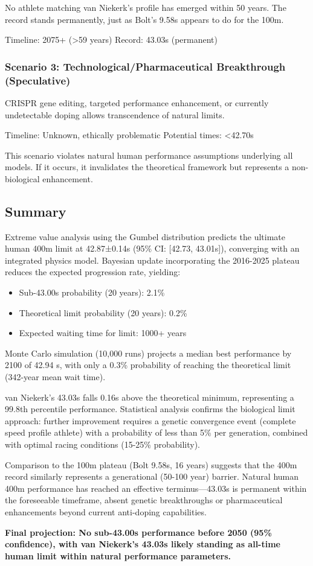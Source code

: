 No athlete matching van Niekerk's profile has emerged within 50 years. The record stands permanently, just as Bolt's 9.58s appears to do for the 100m.

Timeline: 2075+ (>59 years)
Record: 43.03s (permanent)

\subsubsection{Scenario 3: Technological/Pharmaceutical Breakthrough (Speculative)}

CRISPR gene editing, targeted performance enhancement, or currently undetectable doping allows transcendence of natural limits.

Timeline: Unknown, ethically problematic
Potential times: <42.70s

This scenario violates natural human performance assumptions underlying all models. If it occurs, it invalidates the theoretical framework but represents a non-biological enhancement.

\subsection{Summary}

Extreme value analysis using the Gumbel distribution predicts the ultimate human 400m limit at 42.87±0.14s (95\% CI: [42.73, 43.01s]), converging with an integrated physics model. Bayesian update incorporating the 2016-2025 plateau reduces the expected progression rate, yielding:

\begin{itemize}
    \item Sub-43.00s probability (20 years): 2.1\%
    \item Theoretical limit probability (20 years): 0.2\%
    \item Expected waiting time for limit: 1000+ years
\end{itemize}

Monte Carlo simulation (10,000 runs) projects a median best performance by 2100 of 42.94 s, with only a 0.3\% probability of reaching the theoretical limit (342-year mean wait time).

van Niekerk's 43.03s falls 0.16s above the theoretical minimum, representing a 99.8th percentile performance. Statistical analysis confirms the biological limit approach: further improvement requires a genetic convergence event (complete speed profile athlete) with a probability of less than 5\% per generation, combined with optimal racing conditions (15-25\% probability).

Comparison to the 100m plateau (Bolt 9.58s, 16 years) suggests that the 400m record similarly represents a generational (50-100 year) barrier. Natural human 400m performance has reached an effective terminus—43.03s is permanent within the foreseeable timeframe, absent genetic breakthroughs or pharmaceutical enhancements beyond current anti-doping capabilities.

\textbf{Final projection: No sub-43.00s performance before 2050 (95\% confidence), with van Niekerk's 43.03s likely standing as all-time human limit within natural performance parameters.}
